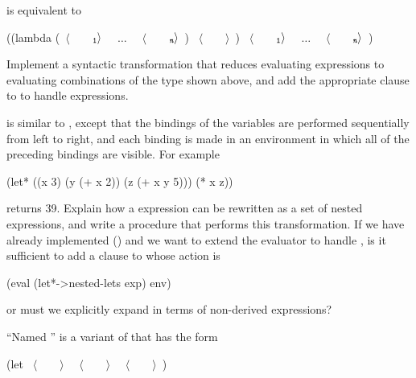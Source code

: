 \begin{exerciseGroup}
\noindent
is equivalent to

\begin{codeBlock}
((lambda (~\(\langle \)~~~~\(_{\mono{1}}\rangle \)~ ~\( \dots \)~ ~\(\langle \)~~~~\(_{\monoItalic{n}}\rangle \)~)
   ~\(\langle \)~~~~\(\rangle \)~)
 ~\(\langle \)~~~~\(_{\mono{1}}\rangle \)~
 ~\( \dots \)~
 ~\(\langle \)~~~~\(_{\monoItalic{n}}\rangle \)~)
\end{codeBlock}

Implement a syntactic transformation  that reduces
evaluating  expressions to evaluating combinations of the type shown
above, and add the appropriate clause to  to handle 
expressions.

\label{Exercise 4.7}
  is similar to
, except that the bindings of the  variables are performed
sequentially from left to right, and each binding is made in an environment in
which all of the preceding bindings are visible.  For example

\begin{codeBlock}
(let* ((x 3)  (y (+ x 2))  (z (+ x y 5)))
  (* x z))
\end{codeBlock}

\noindent
returns 39.  Explain how a  expression can be rewritten as a set of
nested  expressions, and write a procedure 
that performs this transformation.  If we have already implemented 
() and we want to extend the evaluator to handle ,
is it sufficient to add a clause to  whose action is

\begin{codeBlock}
(eval (let*->nested-lets exp) env)
\end{codeBlock}

\noindent
or must we explicitly expand  in terms of non-derived expressions?

\label{Exercise 4.8}
 ``Named '' is a variant
of  that has the form

\begin{codeBlock}
(let ~\(\langle \)~~~~\(\rangle \)~ ~\(\langle \)~~~~\(\rangle \)~ ~\(\langle \)~~~~\(\rangle \)~)
\end{codeBlock}


\end{exerciseGroup}
